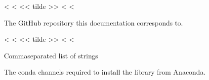 \documentclass[letterpaper,10pt,english]{sphinxmanual}
\begin{document}

\begin{fulllineitems}
\label{\detokenize{confval:confval-github_repository}}
<%
\pysigstartsignatures
<%
<< tilde >>
<%
<%
\vspace{-45px}

\begin{DUlineblock}{0em}
\item[]  
\item[]  
\end{DUlineblock}

\vspace{-25px}

The GitHub repository this documentation corresponds to.

\end{fulllineitems}


\begin{fulllineitems}
\label{\detokenize{confval:confval-conda_channels}}
<%
\pysigstartsignatures
<%
<< tilde >>
<%
<%
\vspace{-45px}

\begin{DUlineblock}{0em}
\item[]  Comma\sphinxhyphen{}separated list of strings
\item[]  
\end{DUlineblock}

\vspace{-25px}

The conda channels required to install the library from Anaconda.

\end{fulllineitems}
\end{document}

